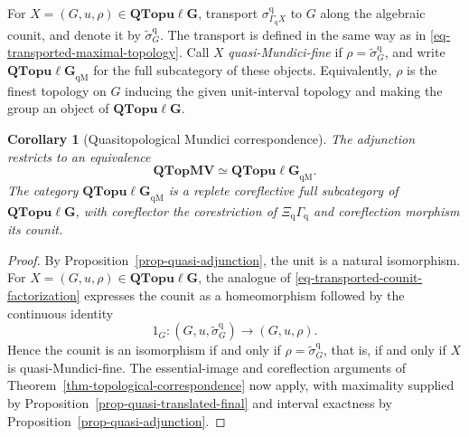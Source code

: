 \documentclass[preprint,3p]{elsarticle}
\theoremstyle{plain}
\newtheorem{cor}[thm]{Corollary}
\theoremstyle{definition}
\newcommand{\QTopMV}{\mathbf{QTopMV}}
\newcommand{\QTopulg}{\mathbf{QTopu\ell G}}
\newcommand{\QTopulgM}{\mathbf{QTopu\ell G}_{\mathrm{qM}}}
\numberwithin{equation}{section}
\begin{document}
For $X=(G,u,\rho)\in\QTopulg$, transport
$\sigma_{\Gamma_{\mathrm q}X}^{\mathrm q}$ to $G$ along the algebraic
counit, and denote it by $\widetilde\sigma_G^{\mathrm q}$.
The transport is defined in the same way as in
\eqref{eq-transported-maximal-topology}.
Call $X$ \emph{quasi-Mundici-fine} if
$\rho=\widetilde\sigma_G^{\mathrm q}$, and write $\QTopulgM$ for
the full subcategory of these objects.
Equivalently, $\rho$ is the finest topology on $G$ inducing the given
unit-interval topology and making the group an object of $\QTopulg$.

\begin{cor}[Quasitopological Mundici correspondence]
\label{thm-quasi-correspondence}
The adjunction restricts to an equivalence
\[
 \QTopMV\simeq\QTopulgM.
\]
The category $\QTopulgM$ is a replete coreflective full
subcategory of $\QTopulg$, with coreflector the corestriction of
$\Xi_{\mathrm q}\Gamma_{\mathrm q}$ and coreflection morphism its counit.
\end{cor}

\begin{proof}
By Proposition~\ref{prop-quasi-adjunction}, the unit is a natural
isomorphism.  For $X=(G,u,\rho)\in\QTopulg$, the analogue of
\eqref{eq-transported-counit-factorization} expresses the counit
as a homeomorphism followed by the continuous identity
\[
 1_G\colon(G,u,\widetilde\sigma_G^{\mathrm q})
 \longrightarrow(G,u,\rho).
\]
Hence the counit is an isomorphism if and only if
$\rho=\widetilde\sigma_G^{\mathrm q}$, that is, if and only if
$X$ is quasi-Mundici-fine.
The essential-image and coreflection arguments of
Theorem~\ref{thm-topological-correspondence} now apply, with
maximality supplied by Proposition~\ref{prop-quasi-translated-final} and interval exactness by
Proposition~\ref{prop-quasi-adjunction}.
\end{proof}
\end{document}
